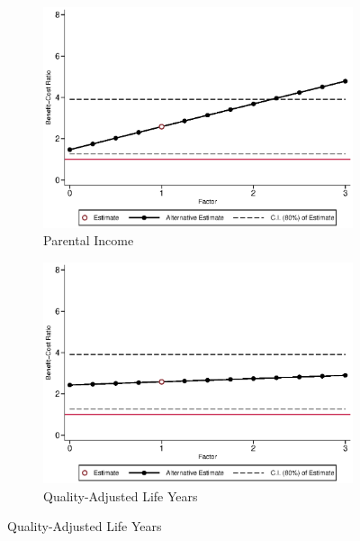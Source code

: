 \begin{figure}[H]
\ContinuedFloat		
	\begin{subfigure}[h]{0.8\textwidth}
	\centering
	\caption{Parental Income} \label{fig:bcrf_inc_parent_f1}
	\includegraphics[width=\textwidth]{AppOutput/Sensitivity/bcrf_inc_parent_f1.eps}
	\end{subfigure}
	
	\begin{subfigure}[h]{0.8\textwidth}
	\centering
	\caption{Quality-Adjusted Life Years} \label{fig:bcrf_qaly_f1}
	\includegraphics[width=\textwidth]{AppOutput/Sensitivity/bcrf_qaly_f1.eps}
	\end{subfigure}
\end{figure}
	

